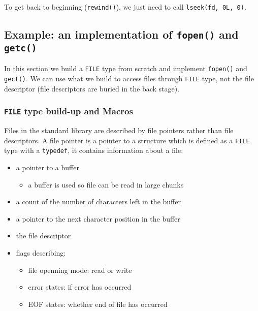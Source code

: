 \documentclass[12pt]{article}
\begin{document}
To get back to beginning (\texttt{rewind()}), we just need to call \texttt{lseek(fd, 0L, 0)}.
\subsection{Example: an implementation of \texttt{fopen()} and \texttt{getc()}}
\label{sec:org613c348}
In this section we build a \texttt{FILE} type from scratch and implement \texttt{fopen()} and \texttt{gect()}. We can use what we build to access files through \texttt{FILE} type, not the file descriptor (file descriptors are buried in the back stage).

\subsubsection{\texttt{FILE} type build-up and Macros}
\label{sec:org9b29c2a}
Files in the standard library are described by file pointers rather than file descriptors. A file pointer is a pointer to a structure which is defined as a \texttt{FILE} type with a \texttt{typedef}, it contains information about a file:
\begin{itemize}
\item a pointer to a buffer
\begin{itemize}
\item a buffer is used so file can be read in large chunks
\end{itemize}
\item a count of the number of characters left in the buffer
\item a pointer to the next character position in the buffer
\item the file descriptor
\item flags describing:
\begin{itemize}
\item file openning mode: read or write
\item error states: if error has occurred
\item EOF states: whether end of file has occurred
\end{itemize}
\end{itemize}
\end{document}
